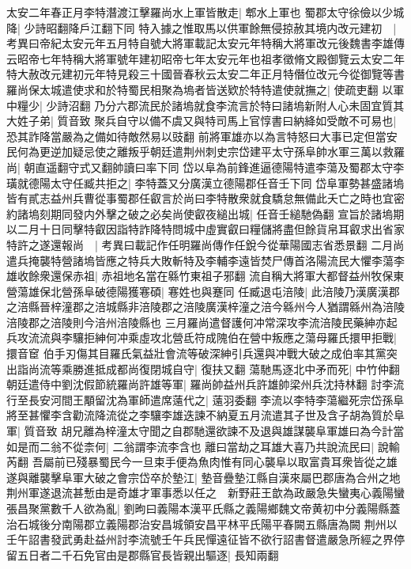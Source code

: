 太安二年春正月李特潛渡江擊羅尚水上軍皆散走|{
	郫水上軍也}
蜀郡太守徐儉以少城降|{
	少詩昭翻降戶江翻下同}
特入據之惟取馬以供軍餘無侵掠赦其境内改元建初　|{
	考異曰帝紀太安元年五月特自號大將軍載記太安元年特稱大將軍改元後魏書李雄傳云昭帝七年特稱大將軍號年建初昭帝七年太安元年也祖孝徵脩文殿御覽云太安二年特大赦改元建初元年特見殺三十國晉春秋云太安二年正月特僭位改元今從御覽等書}
羅尚保太城遣使求和於特蜀民相聚為塢者皆送欵於特特遣使就撫之|{
	使疏吏翻}
以軍中糧少|{
	少詩沼翻}
乃分六郡流民於諸塢就食李流言於特曰諸塢新附人心未固宜質其大姓子弟|{
	質音致}
聚兵自守以備不虞又與特司馬上官惇書曰納絳如受敵不可易也|{
	恐其詐降當嚴為之備如待敵然易以豉翻}
前將軍雄亦以為言特怒曰大事已定但當安民何為更逆加疑忌使之離叛乎朝廷遣荆州刺史宗岱建平太守孫阜帥水軍三萬以救羅尚|{
	朝直遥翻守式又翻帥讀曰率下同}
岱以阜為前鋒進逼德陽特遣李蕩及蜀郡太守李璜就德陽太守任臧共拒之|{
	李特蓋又分廣漢立德陽郡任音壬下同}
岱阜軍勢甚盛諸塢皆有貳志益州兵曹從事蜀郡任叡言於尚曰李特散衆就食驕怠無備此夭亡之時也宜密約諸塢刻期同發内外擊之破之必矣尚使叡夜縋出城|{
	任音壬縋馳偽翻}
宣旨於諸塢期以二月十日同擊特叡因詣特詐降特問城中虛實叡曰糧儲將盡但餘貨帛耳叡求出省家特許之遂還報尚　|{
	考異曰載記作任明羅尚傳作任銳今從華陽國志省悉景翻}
二月尚遣兵掩襲特營諸塢皆應之特兵大敗斬特及李輔李遠皆焚尸傳首洛陽流民大懼李蕩李雄收餘衆還保赤祖|{
	赤祖地名當在緜竹東祖子邪翻}
流自稱大將軍大都督益州牧保東營蕩雄保北營孫阜破德陽獲寋碩|{
	寋姓也與蹇同}
任臧退屯涪陵|{
	此涪陵乃漢廣漢郡之涪縣晉梓潼郡之涪城縣非涪陵郡之涪陵廣漢梓潼之涪今緜州今人猶謂緜州為涪陵涪陵郡之涪陵則今涪州涪陵縣也}
三月羅尚遣督護何冲常深攻李流涪陵民藥紳亦起兵攻流流與李驤拒紳何冲乘虛攻北營氐符成隗伯在營中叛應之蕩母羅氏擐甲拒戰|{
	擐音䆠}
伯手刃傷其目羅氏氣益壯會流等破深紳引兵還與冲戰大破之成伯率其黨突出詣尚流等乘勝進抵成都尚復閉城自守|{
	復扶又翻}
蕩馳馬逐北中矛而死|{
	中竹仲翻}
朝廷遣侍中劉沈假節統羅尚許雄等軍|{
	羅尚帥益州兵許雄帥梁州兵沈持林翻}
討李流行至長安河間王顒留沈為軍師遣席薳代之|{
	薳羽委翻}
李流以李特李蕩繼死宗岱孫阜將至甚懼李含勸流降流從之李驤李雄迭諫不納夏五月流遣其子世及含子胡為質於阜軍|{
	質音致}
胡兄離為梓潼太守聞之自郡馳還欲諫不及退與雄謀襲阜軍雄曰為今計當如是而二翁不從柰何|{
	二翁謂李流李含也}
離曰當劫之耳雄大喜乃共說流民曰|{
	說輸芮翻}
吾屬前已殘暴蜀民今一旦束手便為魚肉惟有同心襲阜以取富貴耳衆皆從之雄遂與離襲擊阜軍大破之會宗岱卒於墊江|{
	墊音疊墊江縣自漢來屬巴郡唐為合州之地}
荆州軍遂退流甚慙由是奇雄才軍事悉以任之　新野莊王歆為政嚴急失蠻夷心義陽蠻張昌聚黨數千人欲為亂|{
	劉昫曰義陽本漢平氏縣之義陽鄉魏文帝黄初中分義陽縣蓋治石城後分南陽郡立義陽郡治安昌城領安昌平林平氏陽平春闕五縣唐為闕}
荆州以壬午詔書發武勇赴益州討李流號壬午兵民憚遠征皆不欲行詔書督遣嚴急所經之界停留五日者二千石免官由是郡縣官長皆親出驅逐|{
	長知兩翻}

